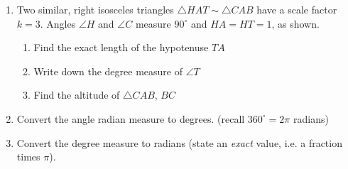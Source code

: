 \documentclass[12pt, twoside]{article}
\begin{document}
\begin{enumerate}
  \item Two similar, right isosceles triangles $\triangle HAT \sim \triangle CAB$ have a scale factor $k= 3$. Angles $\angle H$ and $\angle C$ measure $90^\circ$ and $HA=HT=1$, as shown.
  \begin{multicols}{2}
    \begin{enumerate}[itemsep=0.4cm]
      \item Find the exact length of the hypotenuse $TA$
      \item Write down the degree measure of $\angle T$
      \item Find the altitude of $\triangle CAB$, $BC$
      \end{enumerate}
    \end{multicols} \vspace{0.75cm}

  \item Convert the angle radian measure to degrees. (recall $360^\circ = 2\pi$ radians)
    \begin{enumerate}
      \end{enumerate} \vspace{4cm}
  
  \item Convert the degree measure to radians (state an \emph{exact} value, i.e. a fraction times $\pi$).
    \begin{enumerate}
      \end{enumerate} \vspace{4cm}

\end{enumerate}
\end{document}
